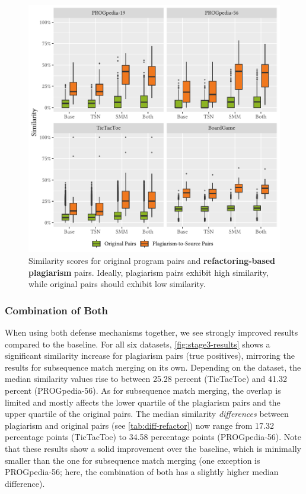 \begin{figure}
\centering
\includegraphics[width=\linewidth]{figures/disseval/eval-refactor_avg.similarity.pdf}
\caption[Evaluation Results: Refactoring-based Obfuscation]{Similarity scores for original program pairs and \textbf{refactoring-based plagiarism} pairs. Ideally, plagiarism pairs exhibit high similarity, while original pairs should exhibit low similarity.}
\label{fig:stage2.5-results}
\end{figure}


\subsubsection{Combination of Both}
When using both defense mechanisms together, we see strongly improved results compared to the baseline.
For all six datasets, \autoref{fig:stage3-results} shows a significant similarity increase for plagiarism pairs (true positives), mirroring the results for subsequence match merging on its own.
Depending on the dataset, the median similarity values rise to between 25.28 percent (TicTacToe) and 41.32 percent (PROGpedia-56).
As for subsequence match merging, the overlap is limited and mostly affects the lower quartile of the plagiarism pairs and the upper quartile of the original pairs.
The median similarity \textit{differences} between plagiarism and original pairs (see \autoref{tab:diff-refactor}) now range from 17.32 percentage points (TicTacToe) to 34.58  percentage points (PROGpedia-56).
Note that these results show a solid improvement over the baseline, which is minimally smaller than the one for subsequence match merging (one exception is PROGpedia-56; here, the combination of both has a slightly higher median difference). 

